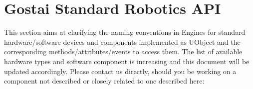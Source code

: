 \newcommand{\slot}[2]{%
  \lstindex{#1} & #2 \\\hline%
}%

\newcommand{\optSlot}[2]{%
  \cellcolor{verylightgray}[\lstindex{#1}] & #2 \\\hline%
}%

\newenvironment{slotsOrEvents}[1]
{%
  \tablehead{%
    \hline%
    \textbf{#1} &%
    \textbf{Description}\\\hline%
  }%
  \begin{supertabular}{|m{.15\textwidth}|m{.8\textwidth}|}%
  }{%
  \end{supertabular}%
}

\newenvironment{slots}
{%
  \begin{slotsOrEvents}{Slot}%
  }{%
  \end{slotsOrEvents}%
}

\newenvironment{events}
{%
  \begin{slotsOrEvents}{Event}%
  }{%
  \end{slotsOrEvents}%
}

\newcommand{\refFacet}[2][]%
  {\hyperref[sec:interface:#2]{\lstinline|#2|#1 (\autoref*{sec:interface:#2})}}

\newcommand{\interface}[2][]{%
  \ifthenelse{\equal{#1}{}}{%
    \subsection{#2\index{#2@\lstinline{#2}}}%
  }{%
    \subsection{#2 (subclass of #1)\index{#2@\lstinline{#2}}}%
  }%
  \label{sec:interface:#2}
}

\newcommand{\gsrapi}{Gostai Standard Robotics API\xspace}
\chapter{Gostai Standard Robotics API}
\label{sec:naming}


This section aims at clarifying the naming conventions in \urbi
Engines for standard hardware/software devices and components
implemented as UObject and the corresponding methods/attributes/events
to access them. The list of available hardware types and software
component is increasing and this document will be updated
accordingly. Please contact us directly, should you be working on a
component not described or closely related to one described here:

